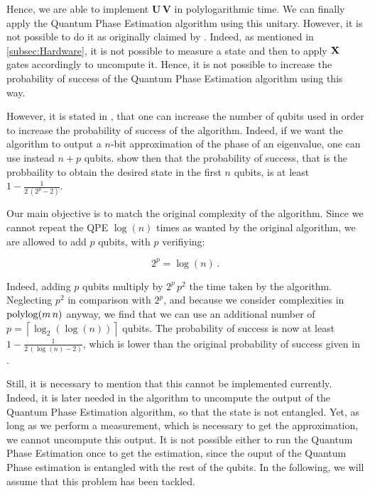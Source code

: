 \documentclass[11pt, a4paper]{article}
\begin{document}
            Hence, we are able to implement \(\mathbf{U}\,\mathbf{V}\) in polylogarithmic time. We can finally apply the Quantum Phase Estimation algorithm using this unitary. However, it is not possible to do it as originally claimed by \citeauthor{QRS}. Indeed, as mentioned in \autoref{subsec:Hardware}, it is not possible to measure a state and then to apply \(\mathbf{X}\) gates accordingly to uncompute it. Hence, it is not possible to increase the probability of success of the Quantum Phase Estimation algorithm using this way.
            
            However, it is stated in \cite{QCAQI}, that one can increase the number of qubits used in order to increase the probability of success of the algorithm. Indeed, if we want the algorithm to output a \(n\)-bit approximation of the phase of an eigenvalue, one can use instead \(n+p\) qubits. \citeauthor{QCAQI} show then that the probability of success, that is the probbaility to obtain the desired state in the first \(n\) qubits, is at least \(1-\frac{1}{2\,\left(2^p-2\right)}\).
            
            Our main objective is to match the original complexity of the algorithm. Since we cannot repeat the QPE \(\log(n)\) times as wanted by the original algorithm, we are allowed to add \(p\) qubits, with \(p\) verifiying:
            
            \[2^p=\log(n)\,.\]
            
            Indeed, adding \(p\) qubits multiply by \(2^p\,p^2\) the time taken by the algorithm. Neglecting \(p^2\) in comparison with \(2^p\), and because we consider complexities in \(\operatorname{polylog}(m\,n)\) anyway, we find that we can use an additional number of \(p=\left\lceil\log_2(\log(n))\right\rceil\) qubits. The probability of success is now at least \(1-\frac{1}{2\,\left(\log(n) - 2\right)}\), which is lower than the original probability of success given in \cite{QRS}.
            
            Still, it is necessary to mention that this cannot be implemented currently. Indeed, it is later needed in the algorithm to uncompute the output of the Quantum Phase Estimation algorithm, so that the state is not entangled. Yet, as long as we perform a measurement, which is necessary to get the approximation, we cannot uncompute this output. It is not possible either to run the Quantum Phase Estimation once to get the estimation, since the ouput of the Quantum Phase estimation is entangled with the rest of the qubits. In the following, we will assume that this problem has been tackled.
            
\end{document}
